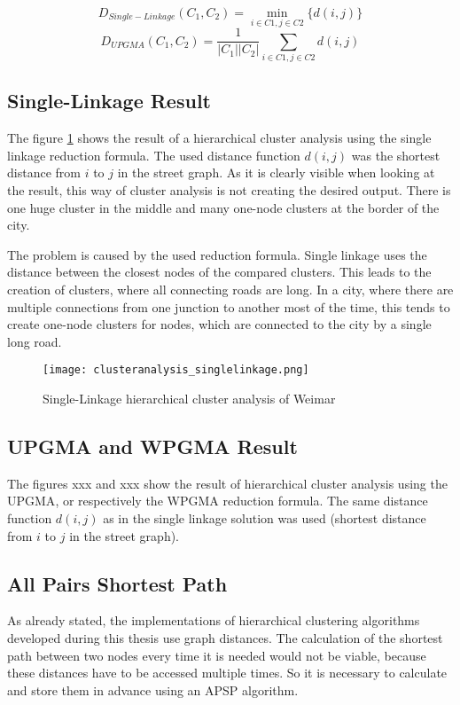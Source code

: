 \begin{equation} \label{eq:df_single_linkage}
D_{Single-Linkage}(C_1, C_2) = \min_{i\in{C1}, j\in{C2}}\{d(i, j)\}
\end{equation}
\begin{equation} \label{eq:df_upgma}
D_{UPGMA}(C_1, C_2) = \dfrac{1}{|C_1||C_2|} \sum_{i\in{C1}, j\in{C2}}{d(i, j)}
\end{equation}

\subsection{Single-Linkage Result}
The figure \ref{fig:SingleLinkage} shows the result of a hierarchical cluster analysis using the single linkage reduction formula. The used distance function $d(i, j)$ was the shortest distance from $i$ to $j$ in the street graph. As it is clearly visible when looking at the result, this way of cluster analysis is not creating the desired output. There is one huge cluster in the middle and many one-node clusters at the border of the city.

The problem is caused by the used reduction formula. Single linkage uses the distance between the closest nodes of the compared clusters. This leads to the creation of clusters, where all connecting roads are long. In a city, where there are multiple connections from one junction to another most of the time, this tends to create one-node clusters for nodes, which are connected to the city by a single long road.

\begin{figure}[!h]
    \centering
    \texttt{[image: clusteranalysis\_singlelinkage.png]}
    \caption{Single-Linkage hierarchical cluster analysis of Weimar\label{fig:SingleLinkage}}
\end{figure}

\subsection{UPGMA and WPGMA Result}
\label{sec:UPGMAandWPGMA}
The figures xxx and xxx show the result of hierarchical cluster analysis using the \acrshort{UPGMA}, or respectively the \acrshort{WPGMA} reduction formula. The same distance function $d(i, j)$ as in the single linkage solution was used (shortest distance from $i$ to $j$ in the street graph).

\subsection{All Pairs Shortest Path} \label{sec:shortest_path}
As already stated, the implementations of hierarchical clustering algorithms developed during this thesis use graph distances. The calculation of the shortest path between two nodes every time it is needed would not be viable, because these distances have to be accessed multiple times. So it is necessary to calculate and store them in advance using an \gls{APSP} algorithm.


